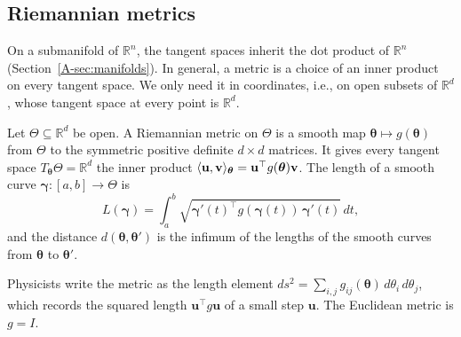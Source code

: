 \subsection{Riemannian metrics}

On a submanifold of $\mathbb{R}^n$, the tangent spaces inherit the dot product of $\mathbb{R}^n$ (Section~\ref{A-sec:manifolds}). In general, a metric is a choice of an inner product on every tangent space. We only need it in coordinates, i.e., on open subsets of $\mathbb{R}^d$, whose tangent space at every point is $\mathbb{R}^d$.

\begin{definition}\label{A-def:riemannian-metric}
    Let $\Theta \subseteq \mathbb{R}^d$ be open. A Riemannian metric on $\Theta$ is a smooth map $\boldsymbol{\theta} \mapsto g(\boldsymbol{\theta})$ from $\Theta$ to the symmetric positive definite $d \times d$ matrices. It gives every tangent space $T_{\boldsymbol{\theta}}\Theta = \mathbb{R}^d$ the inner product $\langle \mathbf{u}, \mathbf{v} \rangle_{\boldsymbol{\theta}} = \mathbf{u}^\top g(\boldsymbol{\theta})\mathbf{v}$. The length of a smooth curve $\boldsymbol{\gamma}: [a, b] \to \Theta$ is
    \[L(\boldsymbol{\gamma}) = \int_a^b \sqrt{\boldsymbol{\gamma}'(t)^\top g(\boldsymbol{\gamma}(t))\,\boldsymbol{\gamma}'(t)}\, dt,\]
    and the distance $d(\boldsymbol{\theta}, \boldsymbol{\theta}')$ is the infimum of the lengths of the smooth curves from $\boldsymbol{\theta}$ to $\boldsymbol{\theta}'$.
\end{definition}

Physicists write the metric as the length element $ds^2 = \sum_{i,j} g_{ij}(\boldsymbol{\theta})\, d\theta_i\, d\theta_j$, which records the squared length $\mathbf{u}^\top g\mathbf{u}$ of a small step $\mathbf{u}$. The Euclidean metric is $g = I$.

